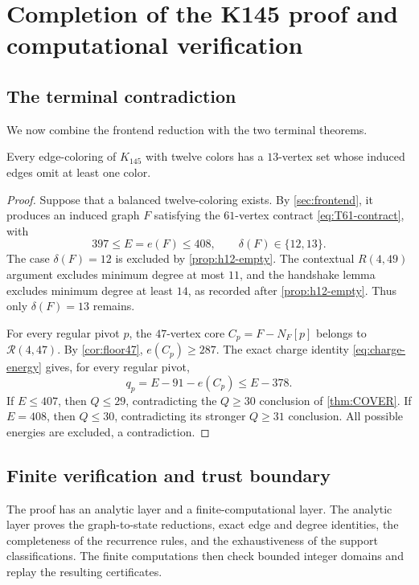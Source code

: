 \section{Completion of the K145 proof and computational verification}
\label{sec:global}

\subsection{The terminal contradiction}

We now combine the frontend reduction with the two terminal theorems.

\begin{theorem}
\label{thm:global}
Every edge-coloring of $K_{145}$ with twelve colors has a $13$-vertex set whose induced edges omit at least one color.
\end{theorem}

\begin{proof}
Suppose that a balanced twelve-coloring exists. By \cref{sec:frontend}, it produces an induced graph $F$ satisfying the $61$-vertex contract \eqref{eq:T61-contract}, with
\[
397\leq E=e(F)\leq408,\qquad \delta(F)\in\{12,13\}.
\]
The case $\delta(F)=12$ is excluded by \cref{prop:h12-empty}. The contextual $R(4,49)$ argument excludes minimum degree at most $11$, and the handshake lemma excludes minimum degree at least $14$, as recorded after \cref{prop:h12-empty}. Thus only $\delta(F)=13$ remains.

For every regular pivot $p$, the $47$-vertex core $C_p=F-N_F[p]$ belongs to $\mathcal R(4,47)$. By \cref{cor:floor47}, $e(C_p)\geq287$. The exact charge identity \eqref{eq:charge-energy} gives, for every regular pivot,
\[
q_p=E-91-e(C_p)\leq E-378.
\]
If $E\leq407$, then $Q\leq29$, contradicting the $Q\geq30$ conclusion of \cref{thm:COVER}. If $E=408$, then $Q\leq30$, contradicting its stronger $Q\geq31$ conclusion. All possible energies are excluded, a contradiction.
\end{proof}

\subsection{Finite verification and trust boundary}

The proof has an analytic layer and a finite-computational layer. The analytic layer proves the graph-to-state reductions, exact edge and degree identities, the completeness of the recurrence rules, and the exhaustiveness of the support classifications. The finite computations then check bounded integer domains and replay the resulting certificates.

